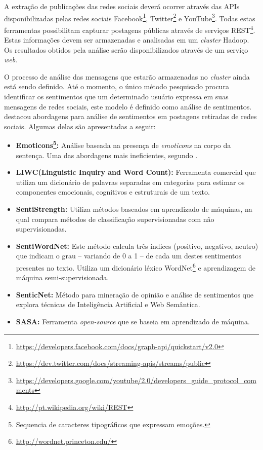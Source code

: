 A extração de publicações das redes sociais deverá ocorrer através das APIs disponibilizadas pelas redes sociais Facebook\footnote{\url{https://developers.facebook.com/docs/graph-api/quickstart/v2.0}}, Twitter\footnote{\url{https://dev.twitter.com/docs/streaming-apis/streams/public}} e YouTube\footnote{\url{https://developers.google.com/youtube/2.0/developers_guide_protocol_comments}}. Todas estas ferramentas possibilitam capturar postagens públicas através de serviços REST\footnote{\url{http://pt.wikipedia.org/wiki/REST}}. Estas informações devem ser armazenadas e analisadas em um \textit{cluster} Hadoop. Os resultados obtidos pela análise serão disponibilizados através de um serviço \textit{web}.

O processo de análise das mensagens que estarão armazenadas no \textit{cluster} ainda está sendo definido. Até o momento, o único método pesquisado procura identificar os sentimentos que um determinado usuário expressa em suas mensagens de redes sociais, este modelo é definido como análise de sentimentos.  destacou abordagens para análise de sentimentos em postagens retiradas de redes sociais. Algumas delas são apresentadas a seguir:

\begin{itemize}

  \item \textbf{Emoticons\footnote{Sequencia de caracteres tipográficos que expressam emoções.}:} Análise baseada na presença de \textit{emoticons} na corpo da sentença. Uma das abordagens mais ineficientes, segundo .
  \item \textbf{LIWC(Linguistic Inquiry and Word Count):} Ferramenta comercial que utiliza um dicionário de palavras separadas em categorias para estimar os componentes emocionais, cognitivos e estruturais de um texto.
  \item \textbf{SentiStrength:} Utiliza métodos baseados em aprendizado de máquinas, na qual compara métodos de classificação supervisionadas com não supervisionadas.
  \item \textbf{SentiWordNet:} Este método calcula três índices (positivo, negativo, neutro) que indicam o grau – variando de 0 a 1 – de cada um destes sentimentos presentes no texto. Utiliza um dicionário léxico WordNet\footnote{\url{http://wordnet.princeton.edu/}} e aprendizagem de máquina semi-supervisionada.
  \item \textbf{SenticNet:} Método para mineração de opinião e análise de sentimentos que explora técnicas de Inteligência Artificial e Web Semântica.
  \item \textbf{SASA:} Ferramenta \textit{open-source} que se baseia em aprendizado de máquina.

\end{itemize}


















